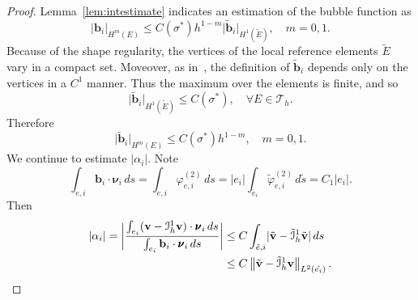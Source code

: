 \begin{proof}
Lemma~\ref{lem:intestimate} indicates an estimation of the bubble function as
\begin{equation}\label{eq:estimatebubble}
\lvert\mathbf{b}_i\rvert_{H^m(E)} \leq C(\sigma^*)h^{1-m}\lvert \tilde{\mathbf{b}}_i \rvert_{H^1(\tilde{E})} 
, \quad m = 0,1.
\end{equation}
Because of the shape regularity, the vertices of the local reference elements $\tilde{E}$ vary in a compact set.
Moveover, as in~\cite{directSerendipity}, the definition of $\tilde{\mathbf{b}}_i$ depends only on the vertices
in a $C^1$ manner. Thus the maximum over the elements is finite, and so
\begin{equation}
\lvert \tilde{\mathbf{b}}_i \rvert_{H^1(\tilde{E})} \leq C(\sigma^*), \quad \forall E \in \mathcal{T}_h.
\end{equation}
Therefore
\begin{equation}
\lvert \tilde{\mathbf{b}}_i \rvert_{H^m(E)} \leq C(\sigma^*) h^{1-m}, \quad m=0,1.
\end{equation}
We continue to estimate $\lvert \alpha_i \rvert$. Note
\begin{equation}
		  \int_{e,i} \mathbf{b}_i\cdot \pmb{\nu}_i \, ds = 
		  \int_{e,i} \varphi^{(2)}_{e,i} \, ds = 
		  \lvert e_i \rvert \int_{\tilde{e}_i} \tilde{\varphi}^{(2)}_{e,i}\, d\tilde{s} = C_1 \lvert e_i \rvert.
\end{equation}
Then
		  \begin{equation}
					 \begin{aligned}
					 \lvert \alpha_i \rvert = \bigg\lvert \frac{ \int_{e_i} (\mathbf{v} - \mathcal{I}^1_{h} \mathbf{v})\cdot \pmb{\nu}_i\, ds}{\int_{e_i} \mathbf{b}_i \cdot 
								\pmb{\nu}_i\, ds} \bigg\rvert &\leq C \int_{\tilde{e},i} \lvert\tilde{\mathbf{v}} - \tilde{\mathcal{I}}^1_{h} \tilde{\mathbf{v}}\rvert\, ds \\
								&\leq C \norm{\tilde{\mathbf{v}} - 
								\tilde{\mathcal{I}}_h^1\mathbf{v}}_{L^2(\tilde{e_i})}.
					 \end{aligned}

\end{equation}
\end{proof}
